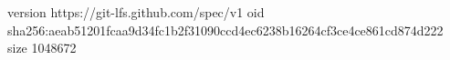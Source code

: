 version https://git-lfs.github.com/spec/v1
oid sha256:aeab51201fcaa9d34fc1b2f31090ccd4ec6238b16264cf3ce4ce861cd874d222
size 1048672
